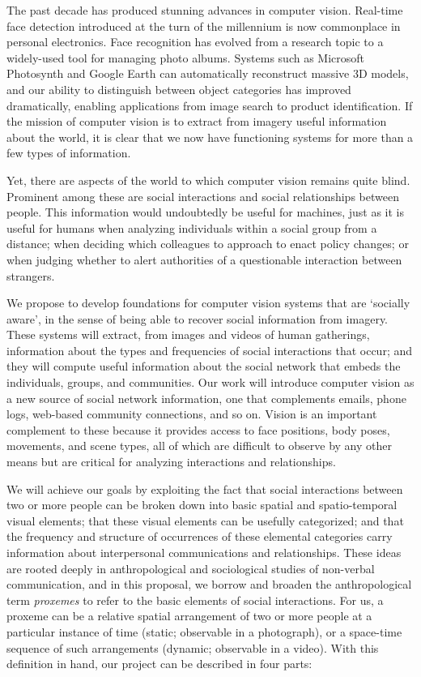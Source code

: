\pagestyle{plain} 

 \label{sec:intro}

The past decade has produced stunning advances in computer vision. Real-time face detection introduced at the turn of the millennium is now commonplace in personal electronics. Face recognition has evolved from a research topic to a widely-used tool for managing photo albums. Systems such as Microsoft Photosynth and Google Earth can automatically reconstruct massive 3D models, and our ability to distinguish between object categories has improved dramatically, enabling applications from image search to product identification. If the mission of computer vision is to extract from imagery useful information about the world, it is clear that we now have functioning systems for more than a few types of information. 

Yet, there are aspects of the world to which computer vision remains quite blind. Prominent among these are social interactions and social relationships between people. This information would undoubtedly be useful for machines, just as it is useful for humans when analyzing individuals within a social group from a distance; when deciding which colleagues to approach to enact policy changes; or when judging whether to alert authorities of a questionable interaction between strangers.

We propose to develop foundations for computer vision systems that are `socially aware', in the sense of being able to recover social information from imagery. These systems will extract, from images and videos of human gatherings,  information about the types and frequencies of social interactions that occur; and they will  compute useful information about the social network that embeds the individuals, groups, and communities.  Our work will introduce computer vision as a new source of social network information, one that complements emails, phone logs, web-based community connections, and so on. Vision is an important complement to these because it provides access to face positions, body poses, movements, and scene types, all of which are difficult to observe by any other means but are critical for analyzing interactions and relationships. 

We will achieve our goals by exploiting the fact that social interactions between two or more people can be broken down into basic spatial and spatio-temporal visual elements; that these visual elements can be usefully categorized; and that the frequency and structure of occurrences of these elemental categories carry information about interpersonal communications and relationships. These ideas are  rooted deeply in  anthropological and sociological studies of non-verbal communication, and in this proposal, we borrow and broaden the anthropological term \emph{proxemes} to refer to the basic elements of social interactions. For us, a proxeme can be a relative spatial arrangement of two or more people at a particular instance of time (static; observable in a photograph), or a space-time sequence of such arrangements (dynamic; observable in a video). With this definition in hand, our project can be described in four parts:

